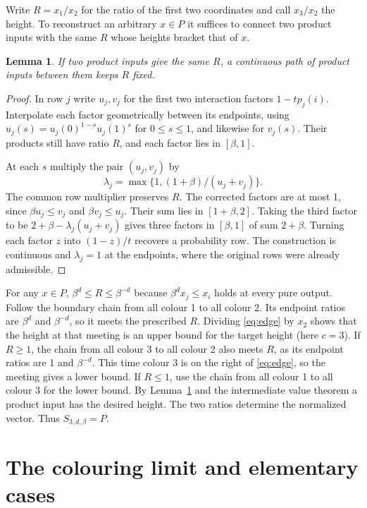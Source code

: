 \documentclass[11pt,reqno]{amsart}
\newtheorem{lemma}[theorem]{Lemma}
\begin{document}
Write $R=x_1/x_2$ for the ratio of the first two coordinates and call $x_3/x_2$ the height. To reconstruct an arbitrary $x\in P$ it suffices to connect two product inputs with the same $R$ whose heights bracket that of $x$.

\begin{lemma}\label{lem:fibre}
If two product inputs give the same $R$, a continuous path of product inputs between them keeps $R$ fixed.
\end{lemma}
\begin{proof}
In row $j$ write $u_j,v_j$ for the first two interaction factors $1-tp_j(i)$. Interpolate each factor geometrically between its endpoints, using $u_j(s)=u_j(0)^{1-s}u_j(1)^s$ for $0\le s\le1$, and likewise for $v_j(s)$. Their products still have ratio $R$, and each factor lies in $[\beta,1]$.

At each $s$ multiply the pair $(u_j,v_j)$ by
\[
 \lambda_j=\max\{1,(1+\beta)/(u_j+v_j)\}.
\]
The common row multiplier preserves $R$. The corrected factors are at most 1, since $\beta u_j\le v_j$ and $\beta v_j\le u_j$. Their sum lies in $[1+\beta,2]$. Taking the third factor to be $2+\beta-\lambda_j(u_j+v_j)$ gives three factors in $[\beta,1]$ of sum $2+\beta$. Turning each factor $z$ into $(1-z)/t$ recovers a probability row. The construction is continuous and $\lambda_j=1$ at the endpoints, where the original rows were already admissible.
\end{proof}

For any $x\in P$, $\beta^d\le R\le\beta^{-d}$ because $\beta^d x_j\le x_i$ holds at every pure output. Follow the boundary chain from all colour 1 to all colour 2. Its endpoint ratios are $\beta^d$ and $\beta^{-d}$, so it meets the prescribed $R$. Dividing \eqref{eq:edge} by $x_2$ shows that the height at that meeting is an upper bound for the target height (here $c=3$). If $R\ge1$, the chain from all colour 3 to all colour 2 also meets $R$, as its endpoint ratios are 1 and $\beta^{-d}$. This time colour 3 is on the right of \eqref{eq:edge}, so the meeting gives a lower bound. If $R\le1$, use the chain from all colour 1 to all colour 3 for the lower bound. By Lemma~\ref{lem:fibre} and the intermediate value theorem a product input has the desired height. The two ratios determine the normalized vector. Thus $S_{3,d,\beta}=P$.

\section{The colouring limit and elementary cases}
\end{document}

